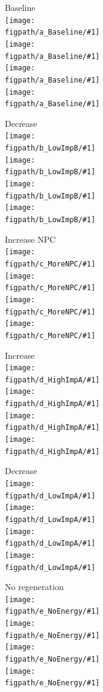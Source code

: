 \documentclass[12pt,notitlepage]{article}
\def\[#1\]{\begin{align}#1\end{align}}
\begin{document}
\begin{figure}[!p]
	\centering

	\newcommand{\figpath}{20211018-Appli/checkpoint/\checkpoint/plot_ss}
	\newcommand{\figures}{\fig{Free ImpA}\\\fig{Free ImpB}\\\fig{Free CAS}\\\fig{Free NLS}}
	
	\begin{minipage}{0.49\textwidth}
		\centering
		Baseline \\[0.5\baselineskip]
		\newcommand\fig[1]{\texttt{[image: \\figpath/a\_Baseline/\#1]}}
		\figures
	\end{minipage}
	\hfill
	\begin{minipage}{0.49\textwidth}
		\centering
		Decrease  \\[0.5\baselineskip]
		\newcommand\fig[1]{\texttt{[image: \\figpath/b\_LowImpB/\#1]}}
		\figures
	\end{minipage}
	
	\vspace{\baselineskip}
	
	\begin{minipage}{0.49\textwidth}
		\centering
		Increase NPC \\[0.5\baselineskip]
		\newcommand\fig[1]{\texttt{[image: \\figpath/c\_MoreNPC/\#1]}}
		\figures
	\end{minipage}
	\hfill
	\begin{minipage}{0.49\textwidth}
		\centering
		Increase  \\[0.5\baselineskip]
		\newcommand\fig[1]{\texttt{[image: \\figpath/d\_HighImpA/\#1]}}
		\figures
	\end{minipage}
	
	\vspace{\baselineskip}
	
	\begin{minipage}{0.49\textwidth}
		\centering
		Decrease  \\[0.5\baselineskip]
		\newcommand\fig[1]{\texttt{[image: \\figpath/d\_LowImpA/\#1]}}
		\figures
	\end{minipage}
	\hfill
	\begin{minipage}{0.49\textwidth}
		\centering
		No  regeneration \\[0.5\baselineskip]
		\newcommand\fig[1]{\texttt{[image: \\figpath/e\_NoEnergy/\#1]}}
		\figures
	\end{minipage}
	

\end{figure}
\end{document}
